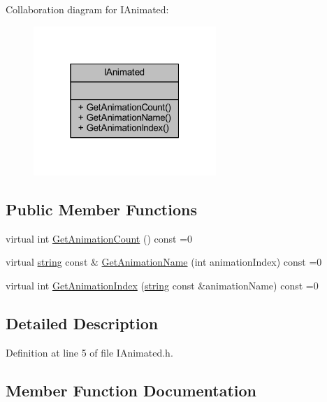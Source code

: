 Collaboration diagram for I\+Animated\+:\nopagebreak
\begin{figure}[H]
\begin{center}
\leavevmode
\includegraphics[width=196pt]{class_i_animated__coll__graph}
\end{center}
\end{figure}
\subsection*{Public Member Functions}
\begin{DoxyCompactItemize}
\item 
virtual int \hyperlink{class_i_animated_a851d42fc3936a93959f8e6f1bf50e5b7}{Get\+Animation\+Count} () const  =0
\item 
virtual \hyperlink{_types_8h_ad453f9f71ce1f9153fb748d6bb25e454}{string} const \& \hyperlink{class_i_animated_a4840f3a1bbcc5e0050bdb0dde1191704}{Get\+Animation\+Name} (int animation\+Index) const  =0
\item 
virtual int \hyperlink{class_i_animated_a33e7b0dd04727e5dc9311c60730ad6e5}{Get\+Animation\+Index} (\hyperlink{_types_8h_ad453f9f71ce1f9153fb748d6bb25e454}{string} const \&animation\+Name) const  =0
\end{DoxyCompactItemize}


\subsection{Detailed Description}


Definition at line 5 of file I\+Animated.\+h.



\subsection{Member Function Documentation}
